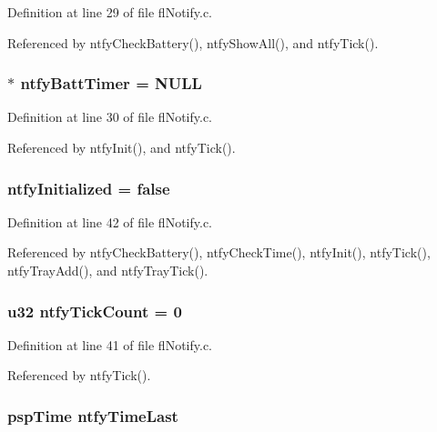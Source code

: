Definition at line 29 of file fl\-Notify.c.

Referenced by ntfy\-Check\-Battery(), ntfy\-Show\-All(), and ntfy\-Tick().
\subsubsection{$\ast$ {\bf ntfy\-Batt\-Timer} = NULL}\label{flNotify_8c_e5c54dd51d7b68d54e0087651022ced5}




Definition at line 30 of file fl\-Notify.c.

Referenced by ntfy\-Init(), and ntfy\-Tick().
\subsubsection{ {\bf ntfy\-Initialized} = false}\label{flNotify_8c_6d3ba2e4609062a98bc1ecdd3dd82afd}




Definition at line 42 of file fl\-Notify.c.

Referenced by ntfy\-Check\-Battery(), ntfy\-Check\-Time(), ntfy\-Init(), ntfy\-Tick(), ntfy\-Tray\-Add(), and ntfy\-Tray\-Tick().
\subsubsection{\setlength{\rightskip}{0pt plus 5cm}u32 {\bf ntfy\-Tick\-Count} = 0}\label{flNotify_8c_8a001c468ca918da05d444cbbc82c21b}




Definition at line 41 of file fl\-Notify.c.

Referenced by ntfy\-Tick().
\subsubsection{\setlength{\rightskip}{0pt plus 5cm}psp\-Time {\bf ntfy\-Time\-Last}}\label{flNotify_8c_bcf0c3d5dc92f30cc21b7de43bf73d57}




